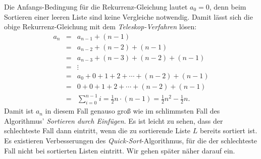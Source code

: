 Die Anfangs-Bedingung f\"ur die Rekurrenz-Gleichung lautet $a_0 = 0$, denn beim Sortieren einer leeren Liste sind keine
Vergleiche notwendig.  Damit l\"asst sich die obige Rekurrenz-Gleichung mit dem \emph{Teleskop-Verfahren} l\"osen:
\[
\begin{array}{lcl}
  a_n & = & a_{n-1} + (n-1) \\
      & = & a_{n-2} + (n-2) + (n-1) \\
      & = & a_{n-3} + (n-3) + (n-2) + (n-1) \\
      & = & \vdots \\
      & = & a_{0} + 0 + 1 + 2 + \cdots  + (n-2) + (n-1) \\
      & = & 0 + 0 + 1 + 2 + \cdots  + (n-2) + (n-1) \\[0.1cm]
      & = & \sum\limits_{i=0}^{n-1} i  =  \frac{1}{2} n \cdot(n - 1) =\frac{1}{2} n^2 - \frac{1}{2} n.
\end{array}
\]
Damit ist $a_n$ in diesem Fall genauso gro\ss{} wie im schlimmsten Fall des Algorithmus' \emph{Sortieren durch Einf\"ugen}.
Es ist leicht zu sehen, dass der schlechteste Fall dann eintritt, wenn die zu sortierende Liste $L$
bereits sortiert ist.  Es existieren Verbesserungen des \emph{Quick-Sort}-Algorithmus, f\"ur
die der schlechteste Fall nicht bei sortierten Listen eintritt.  Wir gehen sp\"ater n\"aher darauf ein.

